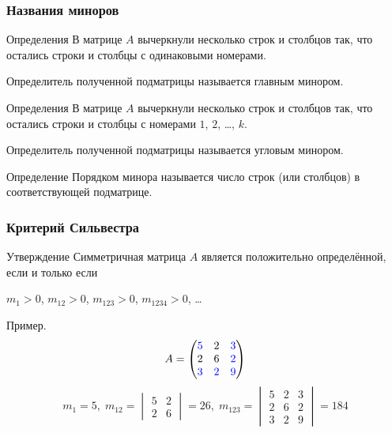 \begin{frame}
\frametitle{Названия миноров}

\begin{block}{Определения}
    В матрице $A$ вычеркнули несколько строк и столбцов так,
    что остались  строки и столбцы с одинаковыми номерами.

    Определитель полученной подматрицы называется \alert{главным минором}.
\end{block}
\pause

\begin{block}{Определения}
    В матрице $A$ вычеркнули несколько строк и столбцов так,
    что остались  строки и столбцы с номерами $1$, $2$, \ldots, $k$.

    Определитель полученной подматрицы называется \alert{угловым минором}.
\end{block}

\pause
\begin{block}{Определение}
    \alert{Порядком} минора называется число строк (или столбцов) в соответствующей подматрице.    
\end{block}


\end{frame}




\begin{frame}
    \frametitle{Критерий Сильвестра}

    \begin{block}{Утверждение}
        Симметричная матрица $A$ является положительно определённой, если и только если

        $m_1 > 0$, $m_{12} > 0$, $m_{123} > 0$, $m_{1234}>0$, \ldots   \pause     
    \end{block}

    Пример. 
\[
A = \begin{pmatrix}
    \textcolor{blue}{5} & 2 & \textcolor{blue}{3}  \\
    2 & 6 & \textcolor{blue}{2} \\
    \textcolor{blue}{3} & \textcolor{blue}{2} & \textcolor{blue}{9} \\
\end{pmatrix}
\]
\[
    m_1 = 5, \; m_{12} = \begin{vmatrix}
        5 & 2 \\
        2 & 6
    \end{vmatrix} = 26, \; 
    m_{123} = \begin{vmatrix}
        5 & 2 & 3 \\
        2 & 6 & 2 \\
        3 & 2 & 9
    \end{vmatrix}=  184
\]
    
\end{frame}


